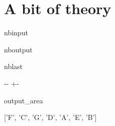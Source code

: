 \documentclass[letterpaper,10pt,english]{sphinxmanual}
\newlength\nbsphinxcodecellspacing
\begin{document}
\section{A bit of theory}
\label{\detokenize{05_data-driven_music_history:A-bit-of-theory}}
\begin{sphinxuseclass}{nbinput}
{
\begin{sphinxVerbatim}[commandchars=\\\{\}]
\llap{\color{nbsphinxin}[2]:\,\hspace{\fboxrule}\hspace{\fboxsep}}   
\end{sphinxVerbatim}
}

\end{sphinxuseclass}
\begin{sphinxuseclass}{nboutput}
\begin{sphinxuseclass}{nblast}
{

\kern-\sphinxverbatimsmallskipamount\kern-\baselineskip
\kern+\FrameHeightAdjust\kern-\fboxrule
\vspace{\nbsphinxcodecellspacing}

\begin{sphinxuseclass}{output_area}
\begin{sphinxuseclass}{}


\begin{sphinxVerbatim}[commandchars=\\\{\}]
\llap{\color{nbsphinxout}[2]:\,\hspace{\fboxrule}\hspace{\fboxsep}}['F', 'C', 'G', 'D', 'A', 'E', 'B']
\end{sphinxVerbatim}



\end{sphinxuseclass}
\end{sphinxuseclass}
}

\end{sphinxuseclass}
\end{sphinxuseclass}
\end{document}
